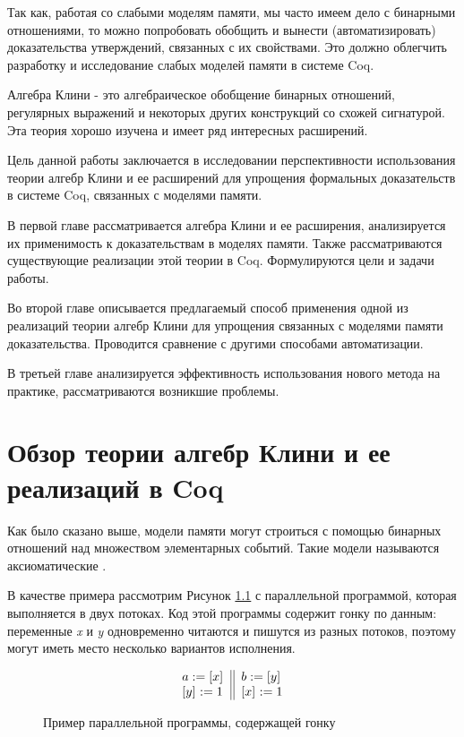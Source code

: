 \documentclass[times
              ,specification
              ,annotation
              ]{itmo-student-thesis}
\begin{document}
  Так как, работая со слабыми моделям памяти, мы часто имеем дело с бинарными отношениями, то можно
  попробовать обобщить и вынести (автоматизировать) доказательства утверждений, связанных с их свойствами.
  Это должно облегчить разработку и исследование слабых моделей памяти в системе Coq.

  Алгебра Клини - это алгебраическое обобщение бинарных отношений, регулярных выражений и некоторых
  других конструкций со схожей сигнатурой.
  Эта теория хорошо изучена и имеет ряд интересных расширений.

  Цель данной работы заключается в исследовании перспективности использования теории алгебр Клини и ее
  расширений для упрощения формальных доказательств в системе Coq, связанных с моделями памяти.


  В первой главе рассматривается алгебра Клини и ее расширения, анализируется их применимость к
  доказательствам в моделях памяти. Также рассматриваются существующие реализации этой теории в Coq.
  Формулируются цели и задачи работы.

  Во второй главе описывается предлагаемый способ применения одной из реализаций теории алгебр Клини
  для упрощения связанных с моделями памяти доказательства. Проводится сравнение с другими способами автоматизации. 

  В третьей главе анализируется эффективность использования нового метода на практике, рассматриваются
  возникшие проблемы.

\chapter{Обзор теории алгебр Клини и ее реализаций в Coq}\label{chapter:1}

  Как было сказано выше, модели памяти могут строиться с помощью бинарных отношений над множеством
  элементарных событий. Такие модели называются аксиоматические \cite{axiomatic_memory_model_for_power_mp}.

  В качестве примера рассмотрим Рисунок \ref{fig:pic1} с параллельной программой,
  которая выполняется в двух потоках. Код этой программы содержит гонку по данным: переменные
  \textit{x} и \textit{y} одновременно читаются и пишутся из разных потоков,
  поэтому могут иметь место несколько вариантов исполнения.

  \begin{figure}[!h]
    \caption{Пример параллельной программы, содержащей гонку}
    \label{fig:pic1}
    \centering
    \begin{equation}
      \inarrII{
        \readInst{}{a}{x}  \\
        \writeInst{}{y}{1} \\
      }{
        \readInst{}{b}{y}  \\
        \writeInst{}{x}{1} \\
      }
    \end{equation}
  \end{figure}
\end{document}
